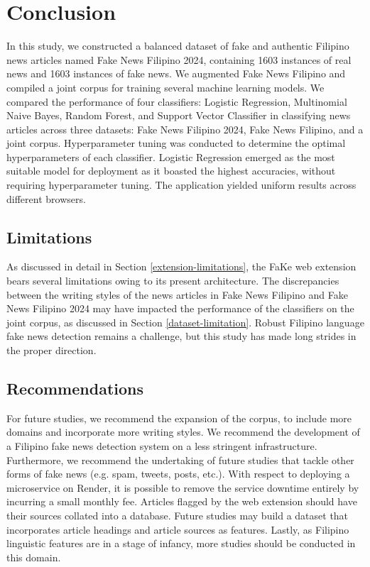 \chapter{Conclusion}

In this study, we constructed a balanced dataset of fake and authentic Filipino news articles named Fake News Filipino 2024, containing 1603 instances of real news and 1603 instances of fake news. We augmented Fake News Filipino and compiled a joint corpus for training several machine learning models. We compared the performance of four classifiers: Logistic Regression, Multinomial Naive Bayes, Random Forest, and Support Vector Classifier in classifying news articles across three datasets: Fake News Filipino 2024, Fake News Filipino, and a joint corpus. Hyperparameter tuning was conducted to determine the optimal hyperparameters of each classifier. Logistic Regression emerged as the most suitable model for deployment as it boasted the highest accuracies, without requiring hyperparameter tuning. The application yielded uniform results across different browsers.

\section{Limitations}

As discussed in detail in Section \ref{extension-limitations}, the FaKe web extension bears several limitations owing to its present architecture. The discrepancies between the writing styles of the news articles in Fake News Filipino and Fake News Filipino 2024 may have impacted the performance of the classifiers on the joint corpus, as discussed in Section \ref{dataset-limitation}. Robust Filipino language fake news detection remains a challenge, but this study has made long strides in the proper direction.

\section{Recommendations}

For future studies, we recommend the expansion of the corpus, to include more domains and incorporate more writing styles. We recommend the development of a Filipino fake news detection system on a less stringent infrastructure. Furthermore, we recommend the undertaking of future studies that tackle other forms of fake news (e.g. spam, tweets, posts, etc.). With respect to deploying a microservice on Render, it is possible to remove the service downtime entirely by incurring a small monthly fee. Articles flagged by the web extension should have their sources collated into a database. Future studies may build a dataset that incorporates article headings and article sources as features. Lastly, as Filipino linguistic features are in a stage of infancy, more studies should be conducted in this domain.